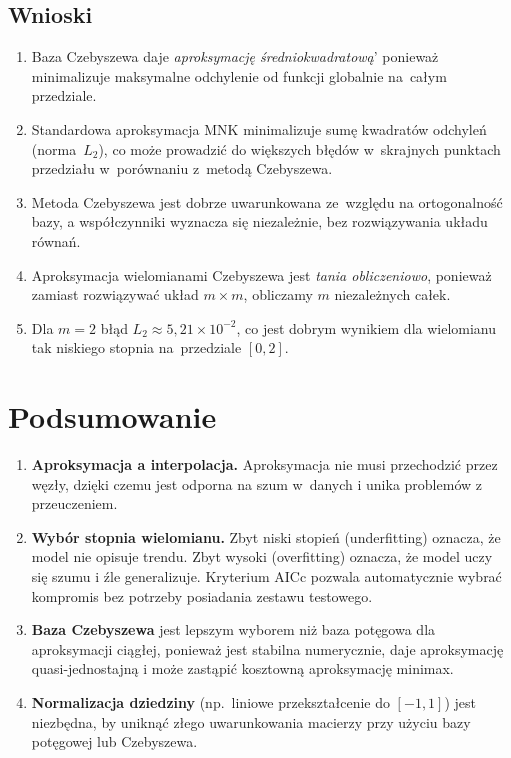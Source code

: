 \documentclass[12pt, a4paper]{article}
\begin{document}
\subsection{Wnioski}

\begin{enumerate}
  \item Baza Czebyszewa daje \emph{aproksymację średniokwadratową}'
        ponieważ minimalizuje maksymalne odchylenie od funkcji
        globalnie na~całym przedziale.

  \item Standardowa aproksymacja MNK minimalizuje sumę kwadratów
        odchyleń (norma~$L_2$), co może prowadzić do większych błędów
        w~skrajnych punktach przedziału w~porównaniu z~metodą
        Czebyszewa.

  \item Metoda Czebyszewa jest dobrze uwarunkowana ze~względu na
        ortogonalność bazy, a współczynniki wyznacza się niezależnie,
        bez rozwiązywania układu równań.

  \item Aproksymacja wielomianami Czebyszewa jest \emph{tania
        obliczeniowo}, ponieważ zamiast rozwiązywać układ $m \times m$,
        obliczamy $m$ niezależnych całek.

  \item Dla $m = 2$ błąd $L_2 \approx 5{,}21 \times 10^{-2}$, co
        jest dobrym wynikiem dla wielomianu tak niskiego stopnia
        na~przedziale $[0, 2]$.
\end{enumerate}

\section{Podsumowanie}

\begin{enumerate}
  \item \textbf{Aproksymacja a interpolacja.} Aproksymacja nie musi
        przechodzić przez węzły, dzięki czemu jest odporna na szum
        w~danych i unika problemów z przeuczeniem.

  \item \textbf{Wybór stopnia wielomianu.} Zbyt niski stopień
        (underfitting) oznacza, że model nie opisuje trendu. Zbyt
        wysoki (overfitting) oznacza, że model uczy się szumu i
        źle generalizuje. Kryterium AICc pozwala automatycznie
        wybrać kompromis bez potrzeby posiadania zestawu testowego.

  \item \textbf{Baza Czebyszewa} jest lepszym wyborem niż baza
        potęgowa dla aproksymacji ciągłej, ponieważ jest stabilna
        numerycznie, daje aproksymację quasi-jednostajną i może
        zastąpić kosztowną aproksymację minimax.

  \item \textbf{Normalizacja dziedziny} (np.~liniowe przekształcenie
        do $[-1, 1]$) jest niezbędna, by uniknąć złego uwarunkowania
        macierzy przy użyciu bazy potęgowej lub Czebyszewa.
\end{enumerate}
\end{document}
